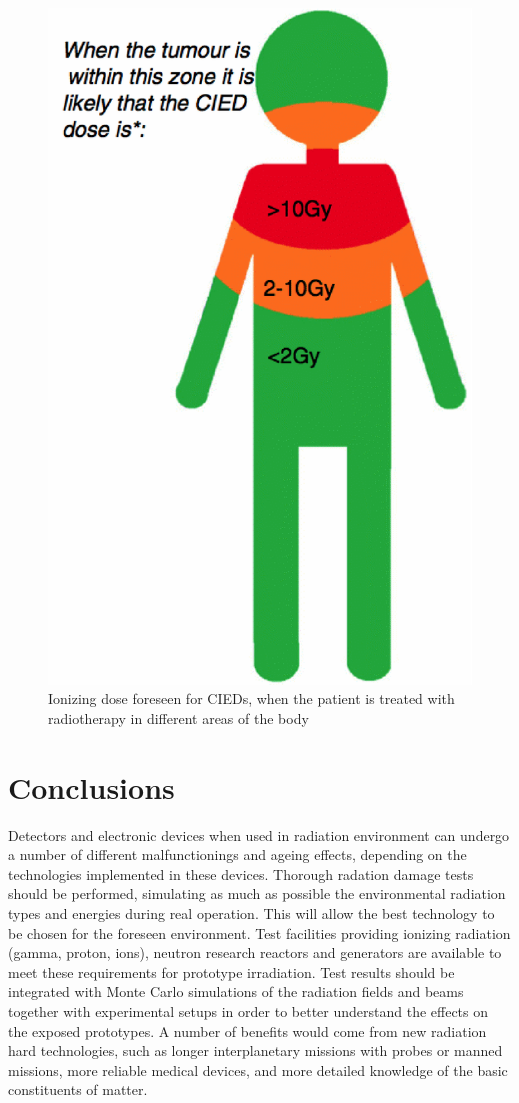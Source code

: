 \documentclass[twoside,a4paper]{article}
\begin{document}
\begin{figure}[h!]
\includegraphics  [width = 0.8  \textwidth] {omino.eps}
\caption{Ionizing dose foreseen for CIEDs, when the patient is treated with radiotherapy in different areas of the body \cite{dutch}}
\label{fig:omino}
\end{figure}


\section{Conclusions}
Detectors and electronic devices when used in radiation environment can undergo a number of different malfunctionings and ageing effects, depending on the technologies implemented in these devices. Thorough radation damage tests should be performed, simulating as much as possible the environmental radiation types and energies during real operation. This will allow the best technology to be chosen for the foreseen environment. Test facilities providing ionizing radiation (gamma, proton, ions), neutron research reactors and generators are available to meet these requirements for prototype irradiation. Test results should be integrated with Monte Carlo simulations of the radiation fields and beams together with experimental setups in order to better understand the effects on the exposed prototypes. A number of benefits would come from new radiation hard technologies, such as longer interplanetary missions with probes or manned missions, more reliable medical devices, and more detailed knowledge of the basic constituents of matter.
\end{document}
